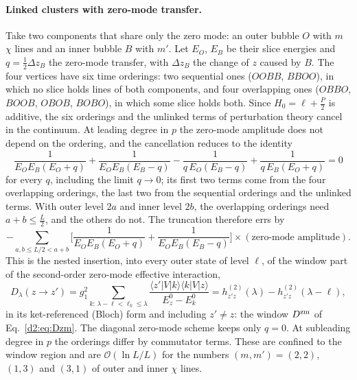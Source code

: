 \paragraph{Linked clusters with zero-mode transfer.} Take two components that share only the zero mode: an outer bubble $O$
with $m$ $\chi$ lines and an inner bubble $B$ with $m'$. Let $E_O$, $E_B$ be their slice energies and $q=\frac12\Delta z_B$ the
zero-mode transfer, with $\Delta z_B$ the change of $z$ caused by $B$. The four vertices
have six time orderings: two sequential ones ($OOBB$, $BBOO$), in which no slice holds lines of both components, and four
overlapping ones ($OBBO$, $BOOB$, $OBOB$, $BOBO$), in which some slice holds both. Since $H_0=\ell+\frac P2$ is additive, the
six orderings and the unlinked terms of perturbation theory cancel in the continuum. At leading degree in $p$ the zero-mode
amplitude does not depend on the ordering, and the cancellation reduces to the identity
\begin{equation}
 \frac1{E_OE_B(E_O+q)}+\frac1{E_OE_B(E_B-q)}-\frac1{q\,E_O(E_B-q)}+\frac1{q\,E_B(E_O+q)}=0
\end{equation}
for every $q$, including the limit $q\to0$; its first two terms come from the four overlapping orderings, the last two from
the sequential orderings and the unlinked terms. With outer level $2a$ and inner level $2b$, the overlapping orderings need
$a+b\le\frac L2$, and the others do not. The truncation therefore errs by
\begin{equation}
 -\sum_{a,b\le L/2<a+b}\Big[\frac1{E_OE_B(E_O+q)}+\frac1{E_OE_B(E_B-q)}\Big]\times(\text{zero-mode amplitude}).
\end{equation}
This is the nested insertion, into every outer state of level $\ell$, of the window part of the second-order zero-mode
effective interaction,
\begin{equation}
 D_\lambda(z\to z')=g_1^2\sum_{k:\,\lambda-\ell<\ell_k\le\lambda}\frac{\langle z'|V|k\rangle\langle k|V|z\rangle}{E^0_z-E^0_k}
 =h^{(2)}_{z'z}(\lambda)-h^{(2)}_{z'z}(\lambda-\ell),
 \label{d2:eq:Dwindow}
\end{equation}
in its ket-referenced (Bloch) form and including $z'\neq z$: the window $D^{\rm zm}$ of Eq.~\eqref{d2:eq:Dzm}. The diagonal
zero-mode scheme keeps only $q=0$. At subleading degree in $p$ the orderings differ by commutator terms. These are confined to
the window region and are $\mathcal O(\ln L/L)$ for the numbers $(m,m')=(2,2)$, $(1,3)$ and $(3,1)$ of outer and inner $\chi$
lines.

